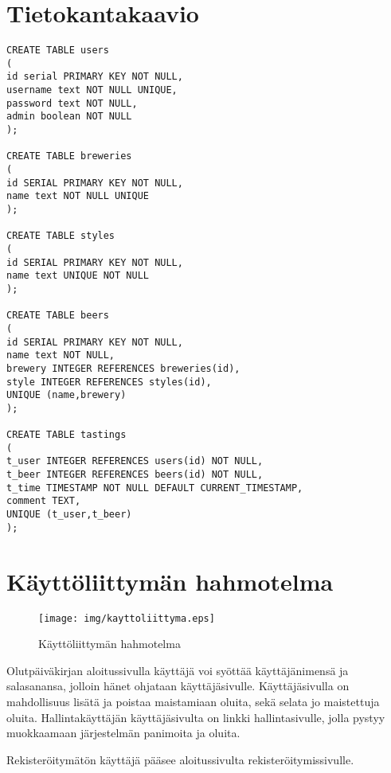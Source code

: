 \documentclass[12pt]{article}
\begin{document}
\section{Tietokantakaavio}

\begin{verbatim}
CREATE TABLE users
(
id serial PRIMARY KEY NOT NULL,
username text NOT NULL UNIQUE,
password text NOT NULL,
admin boolean NOT NULL
);

CREATE TABLE breweries
(
id SERIAL PRIMARY KEY NOT NULL,
name text NOT NULL UNIQUE
);

CREATE TABLE styles
(
id SERIAL PRIMARY KEY NOT NULL,
name text UNIQUE NOT NULL
);

CREATE TABLE beers
(
id SERIAL PRIMARY KEY NOT NULL,
name text NOT NULL,
brewery INTEGER REFERENCES breweries(id),
style INTEGER REFERENCES styles(id),
UNIQUE (name,brewery)
);

CREATE TABLE tastings
(
t_user INTEGER REFERENCES users(id) NOT NULL,
t_beer INTEGER REFERENCES beers(id) NOT NULL,
t_time TIMESTAMP NOT NULL DEFAULT CURRENT_TIMESTAMP,
comment TEXT,
UNIQUE (t_user,t_beer)
);
\end{verbatim}

\section{Käyttöliittymän hahmotelma}

\begin{figure}[H]
  \centering
  \texttt{[image: img/kayttoliittyma.eps]}
  \caption{Käyttöliittymän hahmotelma}
\end{figure}

Olutpäiväkirjan aloitussivulla käyttäjä voi syöttää käyttäjänimensä ja salasanansa, jolloin hänet ohjataan käyttäjäsivulle. Käyttäjäsivulla on mahdollisuus lisätä ja poistaa maistamiaan oluita, sekä selata jo maistettuja oluita. Hallintakäyttäjän käyttäjäsivulta on linkki hallintasivulle, jolla pystyy muokkaamaan järjestelmän panimoita ja oluita.

Rekisteröitymätön käyttäjä pääsee aloitussivulta rekisteröitymissivulle.
\end{document}

